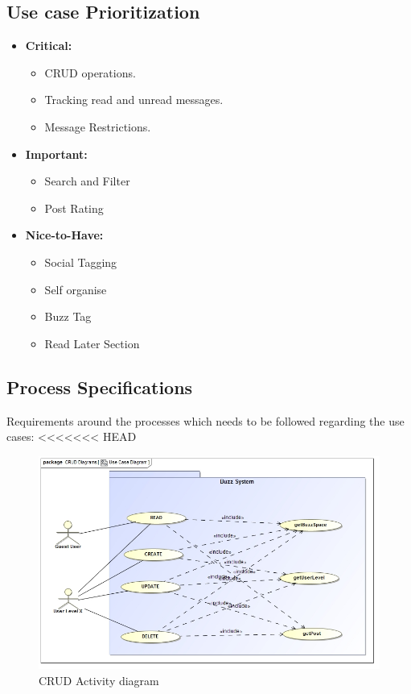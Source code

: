 \documentclass[11pt]{article}
\begin{document}
\subsection{Use case Prioritization}
\begin{itemize}
\item \textbf{Critical: }
	\begin{itemize}
		\item CRUD operations.
		\item Tracking read and unread messages.
		\item Message Restrictions.
	\end{itemize}

\item \textbf{Important: }
	\begin{itemize}
		\item Search and Filter
		\item Post Rating
	\end{itemize}

\item \textbf{Nice-to-Have: }
	\begin{itemize}
		\item Social Tagging
		\item Self organise
		\item Buzz Tag
		\item Read Later Section
	\end{itemize}
\end{itemize}


\subsection{Process Specifications}
Requirements around the processes which needs to be followed regarding the use cases: \newline
<<<<<<< HEAD
\graphicspath{ {../Diagrams/Kyhle/Activity_Diagrams/} }
	\begin{figure}[H]	
    	\includegraphics[scale=0.5]{CRUD.jpg}
    	\caption{CRUD Activity diagram}
	\end{figure}
    	
\end{document}

